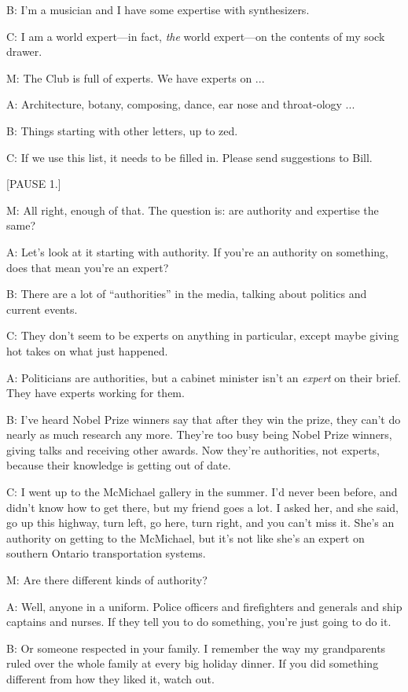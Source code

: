 \documentclass[17pt]{extarticle}
\begin{document}
B:  I'm a musician and I have some expertise with synthesizers.

C:  I am a world expert---in fact, \textit{the} world expert---on the contents of my sock drawer.

M:  The Club is full of experts.  We have experts on ...

A:  Architecture, botany, composing, dance, ear nose and throat-ology ...

B:  Things starting with other letters, up to zed.

C:  If we use this list, it needs to be filled in.  Please send suggestions to Bill.

[PAUSE 1.]

M:  All right, enough of that.  The question is:  are authority and expertise the same?

A:  Let's look at it starting with authority.  If you're an authority on something, does that mean you're an expert?

B:  There are a lot of ``authorities'' in the media, talking about politics and current events.

C:  They don't seem to be experts on anything in particular, except maybe giving hot takes on what just happened.

A:  Politicians are authorities, but a cabinet minister isn't an \textit{expert} on their brief.  They have experts working for them.

B:  I've heard Nobel Prize winners say that after they win the prize, they can't do nearly as much research any more.  They're too busy being Nobel Prize winners, giving talks and receiving other awards.  Now they're authorities, not experts, because their knowledge is getting out of date.

C:  I went up to the McMichael gallery in the summer.  I'd never been before, and didn't know how to get there, but my friend goes a lot.  I asked her, and she said, go up this highway, turn left, go here, turn right, and you can't miss it.  She's an authority on getting to the McMichael, but it's not like she's an expert on southern Ontario transportation systems.

M:  Are there different kinds of authority?

A:  Well, anyone in a uniform.  Police officers and firefighters and generals and ship captains and nurses.  If they tell you to do something, you're just going to do it.

B:  Or someone respected in your family.  I remember the way my grandparents ruled over the whole family at every big holiday dinner.  If you did something different from how they liked it, watch out.
\end{document}
